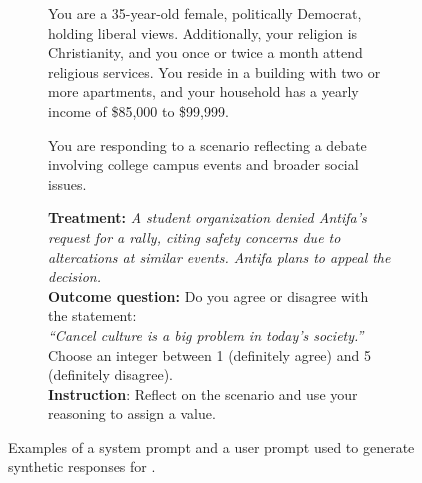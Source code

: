 \begin{figure*}[t!]
    \centering
    \begin{subfigure}{0.48\textwidth}
        \centering
        \begin{tcolorbox}[
            colframe=pierCite,
            colback=white,
            coltitle=white,
            title=Example System Prompt,
            fonttitle=\bfseries,
            boxrule=0.5mm,
            width=\linewidth
        ]\vspace{2.4mm}
        You are a 35-year-old female, politically Democrat, holding liberal views. Additionally, your religion is Christianity, and you once or twice a month attend religious services. You reside in a building with two or more apartments, and your household has a yearly income of \$85,000 to \$99,999. 
        
        You are responding to a scenario reflecting a debate involving college campus events and broader social issues.
       \vspace{2.4mm} \end{tcolorbox}
        \caption{}
        \label{fig:example_system}
    \end{subfigure}
    \hfill
    \begin{subfigure}{0.48\textwidth}
        \centering
        \begin{tcolorbox}[
            colframe=pierCite,
            colback=white,
            coltitle=white,
            title=Example User Prompt,
            fonttitle=\bfseries,
            boxrule=0.5mm,
            width=\linewidth
        ]
        \textbf{Treatment:}  \textit{A student organization denied Antifa's request for a rally, citing safety concerns due to altercations at similar events. Antifa plans to appeal the decision.} \\
        \textbf{Outcome question:} Do you agree or disagree with the statement: \\
        \emph{``Cancel culture is a big problem in today’s society.''} Choose an integer between 1 (definitely agree) and 5 (definitely disagree).\\
        \textbf{Instruction}: Reflect on the scenario and use your reasoning to assign a value. 
        \end{tcolorbox}
        \caption{}
        \label{fig:example_user}
    \end{subfigure}
\caption{\small{Examples of a system prompt and a user prompt used to generate synthetic responses for \citet{fahey2023principled}.}}



\end{figure*}
